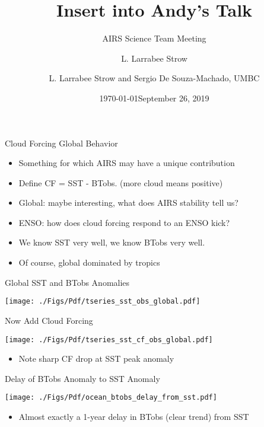 \documentclass[10pt,t]{beamer}
\author{L. Larrabee Strow}
\date{\today}
\title{\large Insert into Andy's Talk}
\subtitle{\footnotesize{AIRS Science Team Meeting}}
\date{\vspace{0.1in}\footnotesize{September 26, 2019\vfill}}
\author{L. Larrabee Strow\inst{1,2} and Sergio De Souza-Machado, UMBC\inst{1,2}}
\institute[UMBC]{\inst{1} UMBC Physics Dept. \and \inst{2}UMBC JCET}
\begin{document}
\maketitle
{}

\begin{frame}[label={sec:org3bb2cc2}]{Cloud Forcing Global Behavior}
\begin{itemize}
\item Something for which AIRS may have a unique contribution
\item Define CF = SST - BTobs.  (more cloud means positive)
\item Global: maybe interesting, what does AIRS stability tell us?
\item ENSO:  how does cloud forcing respond to an ENSO kick?
\item We know SST very well, we know BTobs very well.
\item Of course, global dominated by tropics
\end{itemize}
\end{frame}

\begin{frame}[label={sec:org5daea07}]{Global SST and BTobs Anomalies}
\begin{center}
\texttt{[image: ./Figs/Pdf/tseries\_sst\_obs\_global.pdf]}
\end{center}
\end{frame}


\begin{frame}[label={sec:org08646cf}]{Now Add Cloud Forcing}
\begin{center}
\texttt{[image: ./Figs/Pdf/tseries\_sst\_cf\_obs\_global.pdf]}
\end{center}

\small 
\begin{itemize}
\item Note sharp CF drop at SST peak anomaly
\end{itemize}
\end{frame}

\begin{frame}[label={sec:orge4a7257}]{Delay of BTobs Anomaly to SST Anomaly}
\begin{center}
\texttt{[image: ./Figs/Pdf/ocean\_btobs\_delay\_from\_sst.pdf]}
\end{center}

\small 
\begin{itemize}
\item Almost exactly a 1-year delay in BTobs (clear trend) from SST
\end{itemize}
\end{frame}
\end{document}
